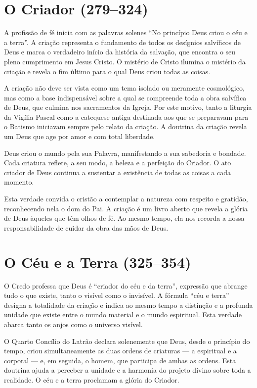 \section{O Criador (279--324)}

A profissão de fé inicia com as palavras solenes ``No princípio Deus criou o céu e a terra''. A criação representa o fundamento de todos os desígnios salvíficos de Deus e marca o verdadeiro início da história da salvação, que encontra o seu pleno cumprimento em Jesus Cristo. O mistério de Cristo ilumina o mistério da criação e revela o fim último para o qual Deus criou todas as coisas.

A criação não deve ser vista como um tema isolado ou meramente cosmológico, mas como a base indispensável sobre a qual se compreende toda a obra salvífica de Deus, que culmina nos sacramentos da Igreja. Por este motivo, tanto a liturgia da Vigília Pascal como a catequese antiga destinada aos que se preparavam para o Batismo iniciavam sempre pelo relato da criação. A doutrina da criação revela um Deus que age por amor e com total liberdade.

Deus criou o mundo pela sua Palavra, manifestando a sua sabedoria e bondade. Cada criatura reflete, a seu modo, a beleza e a perfeição do Criador. O ato criador de Deus continua a sustentar a existência de todas as coisas a cada momento.

Esta verdade convida o cristão a contemplar a natureza com respeito e gratidão, reconhecendo nela o dom do Pai. A criação é um livro aberto que revela a glória de Deus àqueles que têm olhos de fé. Ao mesmo tempo, ela nos recorda a nossa responsabilidade de cuidar da obra das mãos de Deus.

\section{O Céu e a Terra (325--354)}

O Credo professa que Deus é ``criador do céu e da terra'', expressão que abrange tudo o que existe, tanto o visível como o invisível. A fórmula ``céu e terra'' designa a totalidade da criação e indica ao mesmo tempo a distinção e a profunda unidade que existe entre o mundo material e o mundo espiritual. Esta verdade abarca tanto os anjos como o universo visível.

O Quarto Concílio do Latrão declara solenemente que Deus, desde o princípio do tempo, criou simultaneamente as duas ordens de criaturas — a espiritual e a corporal — e, em seguida, o homem, que participa de ambas as ordens. Esta doutrina ajuda a perceber a unidade e a harmonia do projeto divino sobre toda a realidade. O céu e a terra proclamam a glória do Criador.

